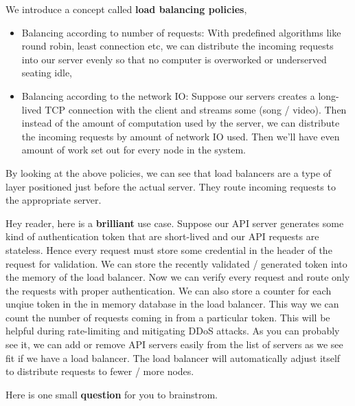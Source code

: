 \documentclass{article}
\theoremstyle{remark}
\begin{document}
We introduce a concept called \textbf{load balancing policies},

\begin{itemize}
    \item Balancing according to number of requests: With predefined algorithms like round robin, least connection etc, we can distribute the incoming requests into our server evenly so that no computer is overworked or underserved seating idle,
    \item Balancing according to the network IO: Suppose our servers creates a long-lived TCP connection with the client and streams some (song / video). Then instead of the amount of computation used by the server, we can distribute the incoming requests by amount of network IO used. Then we'll have even amount of work set out for every node in the system.
\end{itemize}

By looking at the above policies, we can see that load 
balancers are a type of layer positioned just before the actual
server. They route incoming requests to the appropriate server.

Hey reader, here is a \textbf{brilliant} use case. Suppose our API server
generates some kind of authentication token that are short-lived and
our API requests are stateless. Hence every request must store
some credential in the header of the request for validation. We can store the
recently validated / generated token into the memory of the load
balancer. Now we can verify every request and route only the
requests with proper authentication. We can also store a counter
for each unqiue token in the in memory database in the load balancer.
This way we can count the number of requests coming in from a
particular token. This will be helpful during rate-limiting and
mitigating DDoS attacks. As you can probably see it, we can add or remove
API servers easily from the list of servers as we see fit if we have a load
balancer. The load balancer will automatically adjust itself to
distribute requests to fewer / more nodes.

Here is one small \textbf{question} for you to brainstrom.
\end{document}
